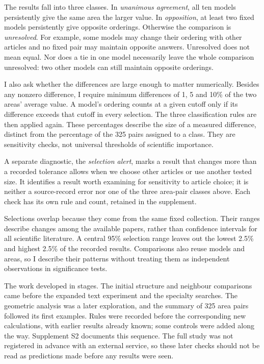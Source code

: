 \documentclass[12pt]{article}
\begin{document}
The results fall into three classes. In \emph{unanimous agreement}, all ten models persistently give the same area the larger value. In \emph{opposition}, at least two fixed models persistently give opposite orderings. Otherwise the comparison is \emph{unresolved}. For example, some models may change their ordering with other articles and no fixed pair may maintain opposite answers. Unresolved does not mean equal. Nor does a tie in one model necessarily leave the whole comparison unresolved: two other models can still maintain opposite orderings.

I also ask whether the differences are large enough to matter numerically. Besides any nonzero difference, I require minimum differences of 1, 5 and 10\% of the two areas' average value. A model's ordering counts at a given cutoff only if its difference exceeds that cutoff in every selection. The three classification rules are then applied again. These percentages describe the size of a measured difference, distinct from the percentage of the 325 pairs assigned to a class. They are sensitivity checks, not universal thresholds of scientific importance.

A separate diagnostic, the \emph{selection alert}, marks a result that changes more than a recorded tolerance allows when we choose other articles or use another tested size. It identifies a result worth examining for sensitivity to article choice; it is neither a source-record error nor one of the three area-pair classes above. Each check has its own rule and count, retained in the supplement.

Selections overlap because they come from the same fixed collection. Their ranges describe changes among the available papers, rather than confidence intervals for all scientific literature. A central 95\% selection range leaves out the lowest 2.5\% and highest 2.5\% of the recorded results. Comparisons also reuse models and areas, so I describe their patterns without treating them as independent observations in significance tests.

The work developed in stages. The initial structure and neighbour comparisons came before the expanded text experiment and the specialty searches. The geometric analysis was a later exploration, and the summary of 325 area pairs followed its first examples. Rules were recorded before the corresponding new calculations, with earlier results already known; some controls were added along the way. Supplement S2 documents this sequence. The full study was not registered in advance with an external service, so these later checks should not be read as predictions made before any results were seen.
\end{document}
